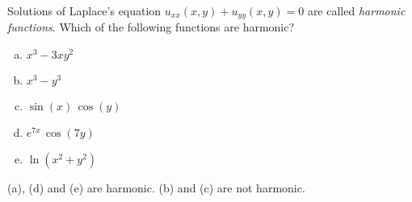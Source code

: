 \begin{question}
Solutions of Laplace's equation $u_{xx}(x,y)+u_{yy}(x,y)=0$ are called
\emph{harmonic functions}. Which of the following functions are harmonic?
\begin{enumerate}[(a)]
\item $x^3-3xy^2$

\item $x^3-y^3$

\item $\sin(x)\,\cos(y)$

\item $e^{7x}\,\cos(7y)$

\item $\ln(x^2+y^2)$

\end{enumerate}
\end{question}

%

\begin{answer}
(a), (d) and (e) are harmonic.
(b) and (c) are not harmonic.
\end{answer}

